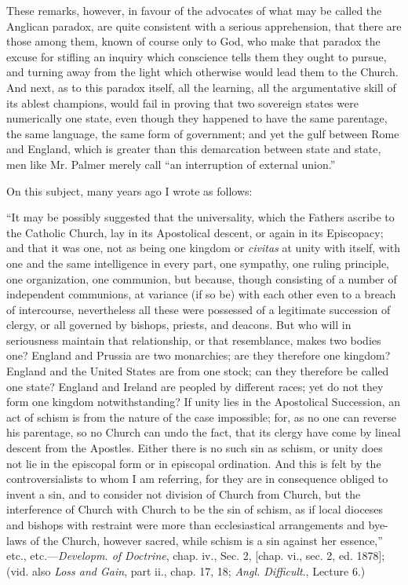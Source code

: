 These remarks, however, in favour of the
advocates of what may be called the Anglican paradox, are quite
consistent with a serious apprehension, that there are those among
them, known of course only to God, who make that paradox the excuse
for stifling an inquiry which conscience tells them they ought to
pursue, and turning away from the light which otherwise would lead
them to the Church. And next, as to this paradox itself, all the
learning, all the argumentative skill of its ablest champions, would
fail in proving that two sovereign states were numerically one state,
even though they happened to have the same parentage, the same
language, the same form of government; and yet the gulf between Rome
and England, which is greater than this demarcation between state and
state, men like Mr. Palmer merely call ``an interruption of external
union.''

On this subject, many years ago I wrote as
follows:

``It may be possibly suggested that the
universality, which the Fathers ascribe to the Catholic Church, lay in
its Apostolical descent, or again in its Episcopacy; and that it was
one, not as being one kingdom or \emph{civitas} at unity with itself,
with one and the same intelligence in every part, one sympathy, one
ruling principle, one organization, one communion, but because, though
consisting of a number of independent communions, at variance (if so
be) with each other even to a breach of intercourse, nevertheless all
these were possessed of a legitimate succession of clergy, or all
governed by bishops, priests, and deacons. But who will in
seriousness maintain that relationship, or that resemblance, makes two
bodies one? England and Prussia are two monarchies; are they therefore
one kingdom? England and the United States are from one stock; can
they therefore be called one state? England and Ireland are peopled by
different races; yet do not they form one kingdom notwithstanding? If
unity lies in the Apostolical Succession, an act of schism is from the
nature of the case impossible; for, as no one can reverse his
parentage, so no Church can undo the fact, that its clergy have come
by lineal descent from the Apostles. Either there is no such sin as
schism, or unity does not lie in the episcopal form or in episcopal
ordination. And this is felt by the controversialists to whom I am
referring, for they are in consequence obliged to invent a sin, and to
consider not division of Church from Church, but the interference of
Church with Church to be the sin of schism, as if local dioceses and
bishops with restraint were more than ecclesiastical arrangements and
bye-laws of the Church, however sacred, while schism is a sin against
her essence,'' etc., etc.—\emph{Developm. of Doctrine}, chap. iv.,
Sec. 2, [chap. vi., sec. 2, ed. 1878]; (vid. also \emph{Loss and Gain},
part ii., chap. 17, 18; \emph{Angl. Difficult}., Lecture 6.)

